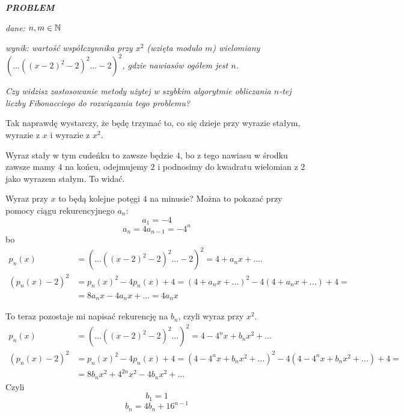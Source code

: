 \documentclass{article}
\begin{document}
\emph{\textbf{PROBLEM}}

\emph{dane: $n,m\in\mathbb{N}$}

\emph{wynik: wartość współczynnika przy $x^2$ (wzięta modulo $m$) wielomiany $(...((x-2)^2-2)^2...-2)^2$, gdzie nawiasów ogółem jest $n$.}

\emph{Czy widzisz zastosowanie metody użytej w szybkim algorytmie obliczania $n$-tej liczby Fibonacciego do rozwiązania tego problemu?}
\medskip

Tak naprawdę wystarczy, że będę trzymać to, co się dzieje przy wyrazie stałym, wyrazie z $x$ i wyrazie z $x^2$. 

Wyraz stały w tym cudeńku to zawsze będzie $4$, bo z tego nawiasu w środku zawsze mamy $4$ na końcu, odejmujemy $2$ i podnosimy do kwadratu wielomian z $2$ jako wyrazem stałym. To widać. 

Wyraz przy $x$ to będą kolejne potęgi $4$ na minusie? Można to pokazać przy pomocy ciągu rekurencyjnego $a_n$:
$$a_1=-4$$
$$a_n=4a_{n-1}=-4^n$$
bo
\begin{align*}
    p_n(x)&=(...((x-2)^2-2)^2...-2)^2=4+a_nx+....\\
    (p_n(x)-2)^2&=p_n(x)^2-4p_n(x)+4=(4+a_nx+...)^2-4(4+a_nx+...)+4=\\
    &=8a_nx-4a_nx+...=4a_nx
\end{align*}

To teraz pozostaje mi napisać rekurencję na $b_n$, czyli wyraz przy $x^2$.
\begin{align*}
    p_n(x)&=(...((x-2)^2-2)^2...)^2=4-4^nx+b_nx^2+...\\
    (p_n(x)-2)^2&=p_n(x)^2-4p_n(x)+4=(4-4^nx+b_nx^2+...)^2-4(4-4^nx+b_nx^2+...)+4=\\
    &=8b_nx^2+4^{2n}x^2-4b_nx^2+...
\end{align*}
Czyli
$$b_1=1$$
$$b_n=4b_n+16^{n-1}$$
\end{document}
